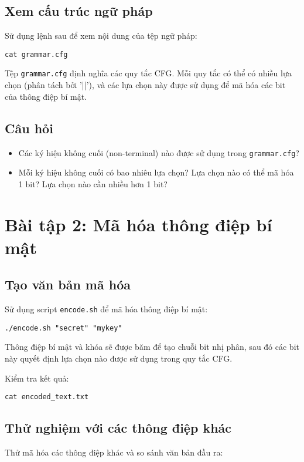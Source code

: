 \documentclass{article}
\begin{document}
\subsection{Xem cấu trúc ngữ pháp}
Sử dụng lệnh sau để xem nội dung của tệp ngữ pháp:

\begin{lstlisting}
cat grammar.cfg
\end{lstlisting}

Tệp \texttt{grammar.cfg} định nghĩa các quy tắc CFG. Mỗi quy tắc có thể có nhiều lựa chọn (phân tách bởi '||'), và các lựa chọn này được sử dụng để mã hóa các bit của thông điệp bí mật.

\subsection{Câu hỏi}
\begin{itemize}
    \item Các ký hiệu không cuối (non-terminal) nào được sử dụng trong \texttt{grammar.cfg}?
    \item Mỗi ký hiệu không cuối có bao nhiêu lựa chọn? Lựa chọn nào có thể mã hóa 1 bit? Lựa chọn nào cần nhiều hơn 1 bit?
\end{itemize}

\section{Bài tập 2: Mã hóa thông điệp bí mật}
\subsection{Tạo văn bản mã hóa}
Sử dụng script \texttt{encode.sh} để mã hóa thông điệp bí mật:

\begin{lstlisting}
./encode.sh "secret" "mykey"
\end{lstlisting}

Thông điệp bí mật và khóa sẽ được băm để tạo chuỗi bit nhị phân, sau đó các bit này quyết định lựa chọn nào được sử dụng trong quy tắc CFG.

Kiểm tra kết quả:

\begin{lstlisting}
cat encoded_text.txt
\end{lstlisting}

\subsection{Thử nghiệm với các thông điệp khác}
Thử mã hóa các thông điệp khác và so sánh văn bản đầu ra:
\end{document}
